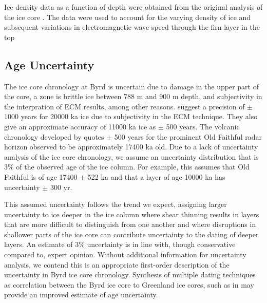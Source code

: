 \documentclass[12pt]{article}
\begin{document}
Ice density data as a function of depth were obtained from the original analysis of the ice core \citep{gow1968}. The data were used to account for the varying density of ice and subsequent variations in electromagnetic wave speed through the firn layer in the top 


\subsection{Age Uncertainty}\label{ageunc}

The ice core chronology at Byrd is uncertain due to damage in the upper part of the core, a zone is brittle ice between 788 m and 900 m depth, and subjectivity in the interpration of ECM results, among other reasons. \citet{hammer1994} suggest a precision of $\pm$ 1000 years for 20000 ka ice due to subjectivity in the ECM technique. They also give an approximate accuracy of 11000 ka ice as $\pm$ 500 years. The volcanic chronology developed by \citet{hammer1997} quotes $\pm$ 500 years for the prominent Old Faithful radar horizon observed to be approximately 17400 ka old. Due to a lack of uncertainty analysis of the ice core chronology, we assume an uncertainty distribution that is 3\% of the observed age of the ice column. For example, this assumes that Old Faithful is of age 17400 $\pm$ 522 ka and that a layer of age 10000 ka has uncertainty $\pm$ 300 yr. 

This assumed uncertainty follows the trend we expect, assigning larger uncertainty to ice deeper in the ice column where shear thinning results in layers that are more difficult to distinguish from one another and where disruptions in shallower parts of the ice core can contribute uncertainty to the dating of deeper layers. An estimate of 3\% uncertainty is in line with, though conservative compared to, expert opinion.  Without additional information for uncertainty analysis, we contend this is an appropriate first-order description of the uncertainty in Byrd ice core chronology. Synthesis of multiple dating techniques as correlation between the Byrd ice core to Greenland ice cores, such as in \citet{blunier2001} may provide an improved estimate of age uncertainty.

\end{document}
